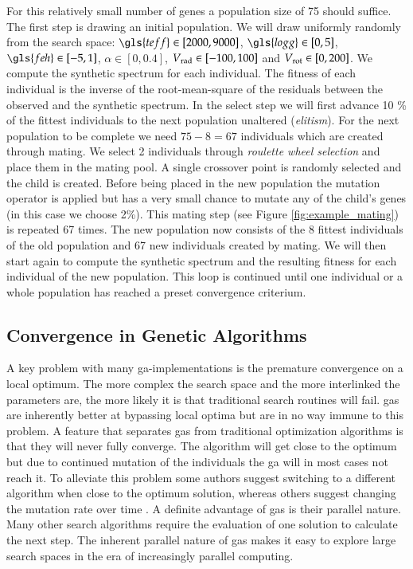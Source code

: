 For this relatively small number of genes a population size of 75 should suffice. The first step is drawing an initial population. We will draw uniformly randomly from the search space: $\gls{teff} \in [2000, 9000]$, $\gls{logg} \in [0, 5]$, $\gls{feh} \in [-5,1]$, $\alpha \in [0,0.4]$, $\hbox{$V_{\textrm{rad}}$} \in [-100, 100]$ and $\hbox{$V_{\textrm{rot}}$} \in [0,200]$. We compute the synthetic spectrum for each individual. The fitness of each individual is the inverse of the root-mean-square of the residuals between the observed and the synthetic spectrum. 
In the select step we will first advance 10 \% of the fittest individuals to the next population unaltered (\textit{elitism}). For the next population to be complete we need $75 - 8 = 67$ individuals which are created through mating. We select 2 individuals through \textit{roulette wheel selection} and place them in the mating pool. A single crossover point is randomly selected and the child is created. Before being placed in the new population the mutation operator is applied but has a very small chance to mutate any of the child's genes (in this case we choose 2\%).
This mating step (see Figure \ref{fig:example_mating}) is repeated 67 times. The new population now consists of the 8 fittest individuals of the old population and 67 new individuals created by mating. We will then start again to compute the synthetic spectrum and the resulting fitness for each individual of the new population. This loop is continued until one individual or a whole population has reached a preset convergence criterium.

\subsection{Convergence in Genetic Algorithms}
A key problem with many \gls{ga}-implementations is the premature convergence on a local optimum. The more complex the search space and the more interlinked the parameters are, the more likely it is that traditional search routines will fail. \glspl{ga} are inherently better at bypassing local optima but are in no way immune to this problem. A feature that separates \glspl{ga} from traditional optimization algorithms is that they will never fully converge. The algorithm will get close to the optimum but due to continued mutation of the individuals the \gls{ga} will in most cases not reach it. To alleviate this problem some authors suggest switching to a different algorithm when close to the optimum solution, whereas others suggest changing the mutation rate over time \citep[see][and references therein]{citeulike:344183}.
A definite advantage of \glspl{ga} is their parallel nature. Many other search algorithms require the evaluation of one solution to calculate the next step. The inherent parallel nature of \glspl{ga} makes it easy to explore large search spaces in the era of increasingly parallel computing. 

